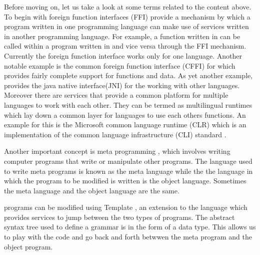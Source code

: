 \documentclass[thesis-solanki.tex]{subfiles}
\begin{document}
Before moving on, let us take a look at some terms related to the content above.
To begin with foreign function interfaces (FFI) \cite{website:ffiwiki} provide a mechanism by which a program
written in one programming language can make use of services written in another programming language.
For example, a function
written in  can be called within a program written in  and vice versa through the FFI
mechanism.
Currently the  foreign function interface works only for one language.
Another notable example is the common foreign function interface (CFFI) \cite{website:commonlisp} for
 which provides fairly complete support for  functions and data.
As yet another example,  provides the java native interface(JNI) for the working with other
languages.
Moreover there are services that provide a common platform for multiple languages to work with each other.
They can be termed as multilingual runtimes
which lay down a common layer for languages to use each others functions.
An example for this is the Microsoft common language runtime (CLR) \cite{website:clrwiki} which is an
implementation of the common language infrastructure (CLI) standard \cite{website:cliwiki}.

Another important concept is meta programming \cite{website:metaprogwiki}, which involves writing computer programs
that write or manipulate other programs.
The language used to write meta programs is known as the meta language while the the language in which the program
to be modified is written is the object language.
Sometimes the meta language and the object language are the same.

 programs can be modified using Template  \cite{website:templatehaskell}, an
extension to the language which provides services to jump between the two types of programs.
The abstract syntax tree used to define a grammar is in the form of a  data type.
This allows us to play with the code and go back and forth betwwen the meta program and the object program.
\end{document}
